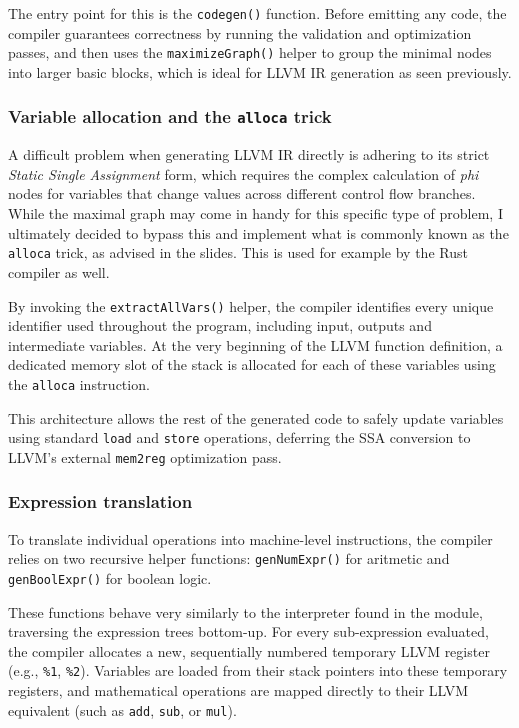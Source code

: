 \documentclass[12pt]{article}
\newcommand{\Code}[1]{\texttt{#1}}
\begin{document}
The entry point for this is the \Code{codegen()} function. Before emitting any
code, the compiler guarantees correctness by running the validation and
optimization passes, and then uses the \Code{maximizeGraph()} helper to group
the minimal nodes into larger basic blocks, which is ideal for LLVM IR
generation as seen previously.

\subsubsection{Variable allocation and the \texttt{alloca} trick}

A difficult problem when generating LLVM IR directly is adhering to its strict
\textit{Static Single Assignment} form, which requires the complex calculation
of \textit{phi} nodes for variables that change values across different control
flow branches. While the maximal graph may come in handy for this specific type
of problem, I ultimately decided to bypass this and implement what is commonly
known as the \texttt{alloca} trick, as advised in the slides. This is used for
example by the Rust compiler as well.

By invoking the \Code{extractAllVars()} helper, the compiler identifies every
unique identifier used throughout the program, including input, outputs and
intermediate variables. At the very beginning of the LLVM function definition, a
dedicated memory slot of the stack is allocated for each of these variables
using the \texttt{alloca} instruction.

This architecture allows the rest of the generated code to safely update
variables using standard \texttt{load} and \texttt{store} operations, deferring
the SSA conversion to LLVM's external \texttt{mem2reg} optimization pass.

\subsubsection{Expression translation}

To translate individual operations into machine-level instructions, the compiler
relies on two recursive helper functions: \Code{genNumExpr()} for aritmetic and
\Code{genBoolExpr()} for boolean logic.

These functions behave very similarly to the interpreter found in the
 module, traversing the expression trees bottom-up. For every
sub-expression evaluated, the compiler allocates a new, sequentially numbered
temporary LLVM register (e.g., \texttt{\%1}, \texttt{\%2}). Variables are loaded
from their stack pointers into these temporary registers, and mathematical
operations are mapped directly to their LLVM equivalent (such as \texttt{add},
\texttt{sub}, or \texttt{mul}).
\end{document}
